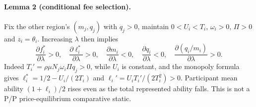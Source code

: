 \paragraph{Lemma 2 (conditional fee selection).}
Fix the other region's $(m_j,q_j)$ with $q_j>0$, maintain $0<U_i<T_i$, $\omega_i>0$, $\Pi>0$ and $z_i=\theta_i$.
Increasing $\lambda$ then implies
\begin{equation}
 \frac{\partial f_i^*}{\partial\lambda}>0,\quad
 \frac{\partial\ell_i^*}{\partial\lambda}>0,\quad
 \frac{\partial m_i}{\partial\lambda}<0,\quad
 \frac{\partial q_i}{\partial\lambda}<0,\quad
 \frac{\partial(q_i/m_i)}{\partial\lambda}>0.
 \label{eq:P2}
\end{equation}
Indeed $T_i'=\rho\mu N_j\omega_i\Pi q_j>0$, while $U_i$ is constant, and the monopoly formula gives
$\ell_i^*=1/2-U_i/(2T_i)$ and $\ell_i'=U_iT_i'/(2T_i^2)>0$.
Participant mean ability $(1+\ell_i)/2$ rises even as the total represented ability falls.
This is not a P/P price-equilibrium comparative static.
